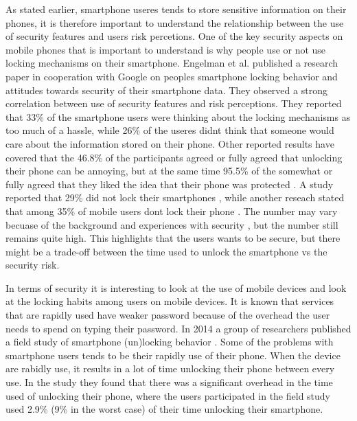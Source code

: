   As stated earlier, smartphone useres tends to store sensitive information on their phones, it is therefore important to understand the relationship between the use of security features and users risk percetions. One of the key security aspects on mobile phones that is important to understand is why people use or not use locking mechanisms on their smartphone. Engelman et al. \cite{Egelman} published a research paper in cooperation with Google on peoples smartphone locking behavior and attitudes towards security of their smartphone data. They observed a strong correlation between use of security features and risk perceptions. They reported that 33\% of the smartphone users were thinking about the locking mechanisms as too much of a hassle, while 26\% of the useres didnt think that someone would care about the information stored on their phone.  Other reported results have covered that the 46.8\% of the participants agreed or fully agreed that unlocking their phone can be annoying, but at the same time 95.5\% of the somewhat or fully agreed that they liked the idea that their phone was protected \cite{habits3}. A study reported that 29\% did not lock their smartphones \cite{MobileUseage}, while another reseach stated that among 35\% of mobile users dont lock their phone \cite{Bruggen}. The number may vary becuase of the background and experiences with security , but the number still remains quite high. This highlights that the users wants to be secure, but there might be a trade-off between the time used to unlock the smartphone vs the security risk. 

  In terms of security it is interesting to look at the use of mobile devices and look at the locking habits among users on mobile devices. It is known that services that are rapidly used have weaker password because of the overhead the user needs to spend on typing their password. In 2014 a group of researchers published a field study of smartphone (un)locking behavior \cite{habits3}. Some of the problems with smartphone users tends to be their rapidly use of their phone. When the device are rabidly use, it results in a lot of time unlocking their phone between every use. In the study they found that there was a significant overhead in the time used of unlocking their phone, where the users participated in the field study used 2.9\% (9\% in the worst case) of their time unlocking their smartphone. 


